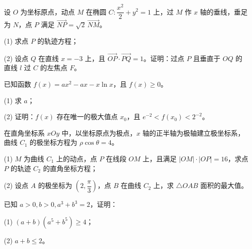 \begin{question}
设 \(O\) 为坐标原点，动点 \(M\) 在椭圆 \(C:\dfrac{x^2}{2}+y^2=1\) 上，过 \(M\) 作 \(x\) 轴的垂线，垂足为 \(N\)，点 \(P\) 满足 \(\overrightarrow{NP}=\sqrt{2}\,\overrightarrow{NM}\)。

   (1) 求点 \(P\) 的轨迹方程；

   (2) 设点 \(Q\) 在直线 \(x=-3\) 上，且 \(\overrightarrow{OP}\cdot\overrightarrow{PQ}=1\)。证明：过点 \(P\) 且垂直于 \(OQ\) 的直线 \(l\) 过 \(C\) 的左焦点 \(F\)。

\end{question}
\begin{question}
已知函数 \(f(x)=ax^2-ax-x\ln x\)，且 \(f(x)\geq 0\)。

   (1) 求 \(a\)；

   (2) 证明：\(f(x)\) 存在唯一的极大值点 \(x_0\)，且 \(e^{-2}<f(x_0)<2^{-2}\)。

\end{question}
\begin{question}
在直角坐标系 \(xOy\) 中，以坐标原点为极点，\(x\) 轴的正半轴为极轴建立极坐标系，曲线 \(C_1\) 的极坐标方程为 \(\rho\cos\theta=4\)。

   (1) \(M\) 为曲线 \(C_1\) 上的动点，点 \(P\) 在线段 \(OM\) 上，且满足 \(|OM|\cdot|OP|=16\)，求点 \(P\) 的轨迹 \(C_2\) 的直角坐标方程；

   (2) 设点 \(A\) 的极坐标为 \((2,\dfrac{\pi}{3})\)，点 \(B\) 在曲线 \(C_2\) 上，求 \(\triangle OAB\) 面积的最大值。

\end{question}
\begin{question}
已知 \(a>0,b>0,a^3+b^3=2\)，证明：

   (1) \((a+b)(a^5+b^5)\geq 4\)；

   (2) \(a+b\leq 2\)。

\end{question}